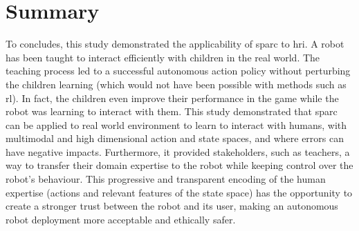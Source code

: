 

\section{Summary}






To concludes, this study demonstrated the applicability of \gls{sparc} to \gls{hri}. A robot has been taught to interact efficiently with children in the real world. The teaching process led to a successful autonomous action policy without perturbing the children learning (which would not have been possible with methods such as \gls{rl}). In fact, the children even improve their performance in the game while the robot was learning to interact with them. This study demonstrated that \gls{sparc} can be applied to real world environment to learn to interact with humans, with multimodal and high dimensional action and state spaces, and where errors can have negative impacts. Furthermore, it provided stakeholders, such as teachers, a way to transfer their domain expertise to the robot while keeping control over the robot's behaviour. This progressive and transparent encoding of the human expertise (actions and relevant features of the state space) has the opportunity to create a stronger trust between the robot and its user, making an autonomous robot deployment more acceptable and ethically safer.


